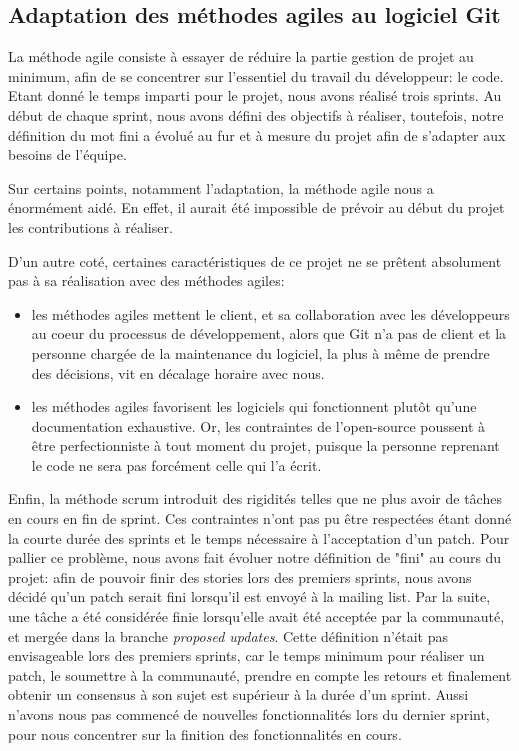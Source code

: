 \documentclass[a4paper, 12pt]{article}
\begin{document}
\subsection{Adaptation des méthodes agiles au logiciel Git}

La méthode agile consiste à essayer de réduire la partie gestion de projet au minimum, afin de se concentrer sur l'essentiel du travail du développeur: le code.
Etant donné le temps imparti pour le projet, nous avons réalisé trois sprints.
Au début de chaque sprint, nous avons défini des objectifs à réaliser, toutefois, notre définition du mot fini a évolué au fur et à mesure du projet afin de s'adapter aux besoins de l'équipe.

Sur certains points, notamment l'adaptation, la méthode agile nous a énormément aidé. En effet, il aurait été impossible de prévoir au début du projet les contributions à réaliser.

D'un autre coté, certaines caractéristiques de ce projet ne se prêtent absolument pas à sa réalisation avec des méthodes agiles:
\begin{itemize}
\item les méthodes agiles mettent le client, et sa collaboration avec les développeurs au coeur du processus de développement, alors que Git n'a pas de client et la personne chargée de la maintenance du logiciel, la plus à même de prendre des décisions, vit en décalage horaire avec nous.
\item les méthodes agiles favorisent les logiciels qui fonctionnent plutôt qu'une documentation exhaustive.
Or, les contraintes de l'open-source poussent à être perfectionniste à tout moment du projet, puisque la personne reprenant le code ne sera pas forcément celle qui l'a écrit.
\end{itemize}

Enfin, la méthode scrum introduit des rigidités telles que ne plus avoir de tâches en cours en fin de sprint.
Ces contraintes n'ont pas pu être respectées étant donné la courte durée des sprints et le temps nécessaire à l'acceptation d'un patch.
Pour pallier ce problème, nous avons fait évoluer notre définition de "fini" au cours du projet: afin de pouvoir finir des stories lors des premiers sprints, nous avons décidé qu'un patch serait fini lorsqu'il est envoyé à la mailing list.
Par la suite, une tâche a été considérée finie lorsqu'elle avait été acceptée par la communauté, et mergée dans la branche \textit{proposed updates}.
Cette définition n'était pas envisageable lors des premiers sprints, car le temps minimum pour réaliser un patch, le soumettre à la communauté, prendre en compte les retours et finalement obtenir un consensus à son sujet est supérieur à la durée d'un sprint.
Aussi n'avons nous pas commencé de nouvelles fonctionnalités lors du dernier sprint, pour nous concentrer sur la finition des fonctionnalités en cours.
\end{document}
